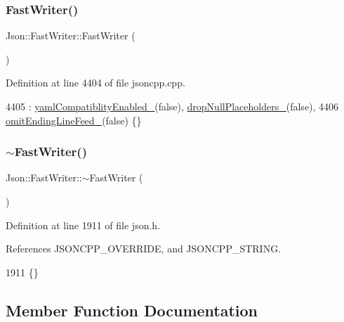 \subsubsection{\texorpdfstring{Fast\+Writer()}{FastWriter()}}
{\footnotesize\ttfamily Json\+::\+Fast\+Writer\+::\+Fast\+Writer (\begin{DoxyParamCaption}{ }\end{DoxyParamCaption})}



Definition at line 4404 of file jsoncpp.\+cpp.


\begin{DoxyCode}
4405     : \hyperlink{class_json_1_1_fast_writer_a4c4c1911179bf472d24492915b0e489a}{yamlCompatiblityEnabled\_}(\textcolor{keyword}{false}), 
      \hyperlink{class_json_1_1_fast_writer_a97e9d4ff84b59a48756dcc27a71b5904}{dropNullPlaceholders\_}(\textcolor{keyword}{false}),
4406       \hyperlink{class_json_1_1_fast_writer_abd6e13851db6dcf59d84af68d48d50ac}{omitEndingLineFeed\_}(\textcolor{keyword}{false}) \{\}
\end{DoxyCode}
\mbox{\label{class_json_1_1_fast_writer_a34152eac509fe00c9b2e15ce2fc94ab8}} 
\subsubsection{\texorpdfstring{$\sim$\+Fast\+Writer()}{~FastWriter()}}
{\footnotesize\ttfamily Json\+::\+Fast\+Writer\+::$\sim$\+Fast\+Writer (\begin{DoxyParamCaption}{ }\end{DoxyParamCaption})\hspace{0.3cm}{\ttfamily [inline]}}



Definition at line 1911 of file json.\+h.



References J\+S\+O\+N\+C\+P\+P\+\_\+\+O\+V\+E\+R\+R\+I\+DE, and J\+S\+O\+N\+C\+P\+P\+\_\+\+S\+T\+R\+I\+NG.


\begin{DoxyCode}
1911 \{\}
\end{DoxyCode}


\subsection{Member Function Documentation}
\mbox{\label{class_json_1_1_fast_writer_a6e93d8dce951e408517311026a065b40}} 
